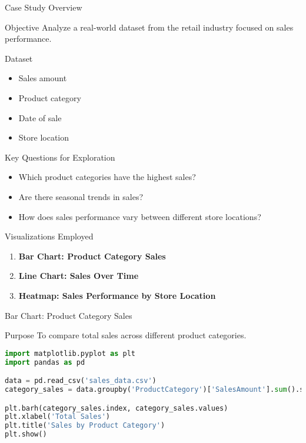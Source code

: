 \documentclass[aspectratio=169]{beamer}
\begin{document}
\begin{frame}{Case Study Overview}
  \begin{block}{Objective}
    Analyze a real-world dataset from the retail industry focused on sales performance.
  \end{block}
  
  \begin{block}{Dataset}
    \begin{itemize}
      \item Sales amount
      \item Product category
      \item Date of sale
      \item Store location
    \end{itemize}
  \end{block}
\end{frame}

\begin{frame}{Key Questions for Exploration}
  \begin{itemize}
    \item Which product categories have the highest sales?
    \item Are there seasonal trends in sales?
    \item How does sales performance vary between different store locations?
  \end{itemize}
\end{frame}

\begin{frame}{Visualizations Employed}
  \begin{enumerate}
    \item \textbf{Bar Chart: Product Category Sales}
    \item \textbf{Line Chart: Sales Over Time}
    \item \textbf{Heatmap: Sales Performance by Store Location}
  \end{enumerate}
\end{frame}

\begin{frame}[fragile]{Bar Chart: Product Category Sales}
  \begin{block}{Purpose}
    To compare total sales across different product categories.
  \end{block}
  
  \begin{lstlisting}[language=Python]
import matplotlib.pyplot as plt
import pandas as pd

data = pd.read_csv('sales_data.csv')
category_sales = data.groupby('ProductCategory')['SalesAmount'].sum().sort_values()

plt.barh(category_sales.index, category_sales.values)
plt.xlabel('Total Sales')
plt.title('Sales by Product Category')
plt.show()
  \end{lstlisting}
\end{frame}
\end{document}
